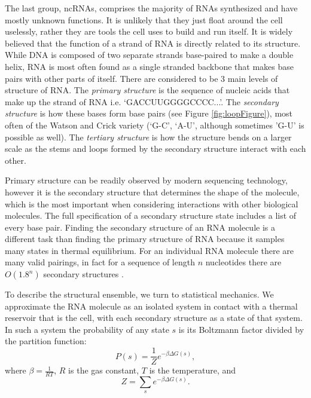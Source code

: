 The last group, ncRNAs, comprises the majority of RNAs synthesized and
have mostly unknown functions. It is unlikely that they just float
around the cell uselessly, rather they are tools the cell uses to
build and run itself. It is widely believed that the function of a
strand of RNA is directly related to its structure. While DNA is
composed of two separate strands base-paired to make a double helix,
RNA is most often found as a single stranded backbone that makes base
pairs with other parts of itself. There are considered to be 3 main
levels of structure of RNA. The \emph{primary structure} is the
sequence of nucleic acids that make up the strand of RNA
i.e. `GACCUUGGGGCCCC...'. The \emph{secondary structure} is how these
bases form base pairs (see Figure \ref{fig:loopFigure}), most often of
the Watson and Crick variety (`G-C', `A-U', although sometimes 'G-U'
is possible as well). The \emph{tertiary structure} is how the
structure bends on a larger scale as the stems and loops formed by the
secondary structure interact with each other.

Primary structure can be readily observed by modern sequencing
technology, however it is the secondary structure that determines the
shape of the molecule, which is the most important when considering
interactions with other biological molecules. The full specification
of a secondary structure state includes a list of every base
pair. Finding the secondary structure of an RNA molecule is a
different task than finding the primary structure of RNA because it
samples many states in thermal equilibrium. For an individual RNA
molecule there are many valid pairings, in fact for a sequence of
length $n$ nucleotides there are $O(1.8^n)$ secondary structures
\cite{hofacker1998combinatorics}.


To describe the structural ensemble, we turn to statistical
mechanics. We approximate the RNA molecule as an isolated system in
contact with a thermal reservoir that is the cell, with each secondary
structure as a state of that system. In such a system the probability
of any state $s$ is its Boltzmann factor divided by the partition
function:
\begin{equation}
P(s) = \frac{1}{Z} e^{-\beta \Delta G(s)},
\end{equation}
where $\beta = \frac{1}{RT}$, $R$ is the gas constant, $T$ is the
temperature, and
\begin{equation}
Z = \sum_{s} e^{-\beta \Delta G(s)}.
\end{equation}

